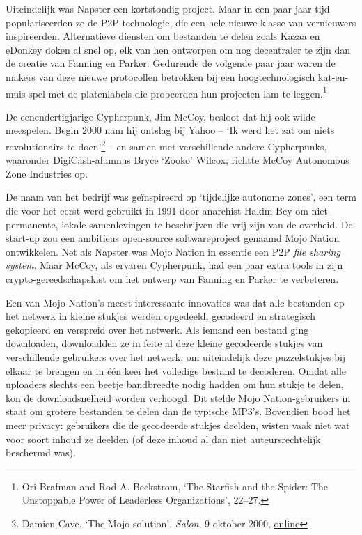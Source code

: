 \documentclass[smalldemyvopaper,11pt,twoside,onecolumn,openright,extrafontsizes,hidelinks]{memoir}
\begin{document}
Uiteindelijk was Napster een kortstondig project. Maar in een paar jaar
tijd populariseerden ze de P2P-technologie, die een hele nieuwe klasse
van vernieuwers inspireerden. Alternatieve diensten om bestanden te
delen zoals Kazaa en eDonkey doken al snel op, elk van hen ontworpen om
nog decentraler te zijn dan de creatie van Fanning en Parker. Gedurende
de volgende paar jaar waren de makers van deze nieuwe protocollen
betrokken bij een hoogtechnologisch kat-en-muis-spel met de platenlabels
die probeerden hun projecten lam te leggen.\footnote{Ori Brafman and Rod
  A. Beckstrom, `The Starfish and the Spider: The Unstoppable Power of
  Leaderless Organizations', 22--27.}

De eenendertigjarige Cypherpunk, Jim McCoy, besloot dat hij ook wilde
meespelen. Begin 2000 nam hij ontslag bij Yahoo -- `Ik werd het zat om
niets revolutionairs te doen'\footnote{Damien Cave, `The Mojo solution',
  \emph{Salon}, 9 oktober 2000,
  \href{https://www.salon.com/2000/10/09/mojo_nation/}{online}} -- en
samen met verschillende andere Cypherpunks, waaronder DigiCash-alumnus
Bryce `Zooko' Wilcox, richtte McCoy Autonomous Zone Industries op.

De naam van het bedrijf was geïnspireerd op `tijdelijke autonome zones',
een term die voor het eerst werd gebruikt in 1991 door anarchist Hakim
Bey om niet-permanente, lokale samenlevingen te beschrijven die vrij
zijn van de overheid. De start-up zou een ambitieus open-source
softwareproject genaamd Mojo Nation ontwikkelen. Net als Napster was
Mojo Nation in essentie een P2P \emph{file sharing system}. Maar McCoy,
als ervaren Cypherpunk, had een paar extra tools in zijn
crypto-gereedschapskist om het ontwerp van Fanning en Parker te
verbeteren.

Een van Mojo Nation's meest interessante innovaties was dat alle
bestanden op het netwerk in kleine stukjes werden opgedeeld, gecodeerd
en strategisch gekopieerd en verspreid over het netwerk. Als iemand een
bestand ging downloaden, downloadden ze in feite al deze kleine
gecodeerde stukjes van verschillende gebruikers over het netwerk, om
uiteindelijk deze puzzelstukjes bij elkaar te brengen en in één keer het
volledige bestand te decoderen. Omdat alle uploaders slechts een beetje
bandbreedte nodig hadden om hun stukje te delen, kon de downloadsnelheid
worden verhoogd. Dit stelde Mojo Nation-gebruikers in staat om grotere
bestanden te delen dan de typische MP3's. Bovendien bood het meer
privacy: gebruikers die de gecodeerde stukjes deelden, wisten vaak niet
wat voor soort inhoud ze deelden (of deze inhoud al dan niet
auteursrechtelijk beschermd was).
\end{document}
